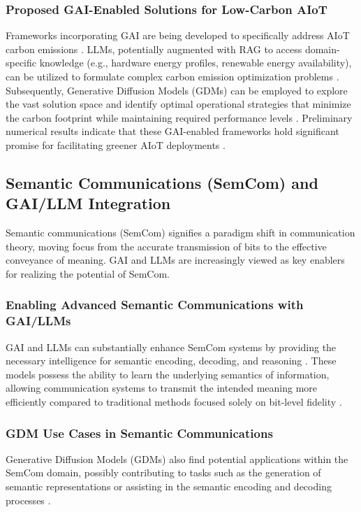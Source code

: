 \documentclass[sigconf]{acmart}
\begin{document}
\subsubsection{Proposed GAI-Enabled Solutions for Low-Carbon AIoT} \label{subsubsec:gai_lowcarbon_solutions}
Frameworks incorporating GAI are being developed to specifically address AIoT carbon emissions \cite{ref29}. LLMs, potentially augmented with RAG to access domain-specific knowledge (e.g., hardware energy profiles, renewable energy availability), can be utilized to formulate complex carbon emission optimization problems \cite{ref29}. Subsequently, Generative Diffusion Models (GDMs) can be employed to explore the vast solution space and identify optimal operational strategies that minimize the carbon footprint while maintaining required performance levels \cite{ref29}. Preliminary numerical results indicate that these GAI-enabled frameworks hold significant promise for facilitating greener AIoT deployments \cite{ref29}.

\subsection{Semantic Communications (SemCom) and GAI/LLM Integration}
\label{subsec:semcom}

Semantic communications (SemCom) signifies a paradigm shift in communication theory, moving focus from the accurate transmission of bits to the effective conveyance of meaning. GAI and LLMs are increasingly viewed as key enablers for realizing the potential of SemCom.

\subsubsection{Enabling Advanced Semantic Communications with GAI/LLMs}
\label{subsubsec:gai_semcom_enable}
GAI and LLMs can substantially enhance SemCom systems by providing the necessary intelligence for semantic encoding, decoding, and reasoning \cite{ref17,ref26}. These models possess the ability to learn the underlying semantics of information, allowing communication systems to transmit the intended meaning more efficiently compared to traditional methods focused solely on bit-level fidelity \cite{ref22,ref24}.

\subsubsection{GDM Use Cases in Semantic Communications} \label{subsubsec:gdm_semcom}
Generative Diffusion Models (GDMs) also find potential applications within the SemCom domain, possibly contributing to tasks such as the generation of semantic representations or assisting in the semantic encoding and decoding processes \cite{ref19}.
\end{document}
